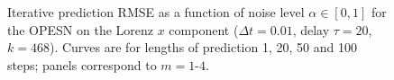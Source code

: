 \begin{figure}
    \centering
    \caption{Iterative prediction RMSE as a function of noise level $\alpha\in[0,1]$ for the OPESN on the Lorenz $x$ component ($\Delta t=0.01$, delay $\tau=20$, $k=468$). Curves are for lengths of prediction 1, 20, 50 and 100 steps; panels correspond to $m=1$-$4$.}
    \label{fig:OPESN_noise_resilience_recursive}
\end{figure}














